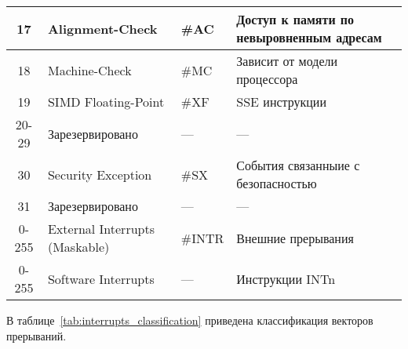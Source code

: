 \begin{center}
\begin{longtable}{|c|p{}|p{}|p{}|}
    \hline
    17  & Alignment-Check & \#AC & Доступ к памяти по невыровненным адресам \\
    \hline
    18  & Machine-Check & \#MC & Зависит от модели процессора \\
    \hline
    19  & SIMD Floating-Point & \#XF & SSE инструкции \\
    \hline
    20-29  & Зарезервировано & --- & --- \\
    \hline
    30  & Security Exception & \#SX & События связанныие с безопасностью \\
    \hline
    31  & Зарезервировано & --- & --- \\
    \hline
    0-255  & External Interrupts (Maskable) & \#INTR & Внешние прерывания \\
    \hline
    0-255  & Software Interrupts & --- & Инструкции INTn \\
    \hline
  \end{longtable}
\end{center}

В таблице~\ref{tab:interrupts_classification} приведена классификация векторов
прерываний.

